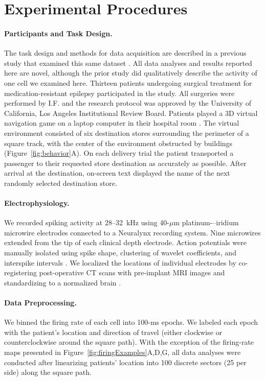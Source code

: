 \section{Experimental Procedures}

\paragraph{Participants and Task Design.} The task design and methods for data acquisition are described in a previous study that examined this same dataset \citep{JacoEtal10}. All data analyses and results reported here are novel, although the prior study \citep{JacoEtal10} did qualitatively describe the activity of one cell we examined here. Thirteen patients undergoing surgical treatment for medication-resistant epilepsy participated in the study.  All surgeries were performed by I.F. and the research protocol was approved by the University of California, Los Angeles Institutional Review Board.  Patients played a 3D virtual navigation game on a laptop computer in their hospital room \citep{EkstEtal03,JacoEtal10,JacoKaha10,JacoEtal13}. The virtual environment consisted of six destination stores surrounding the perimeter of a square track, with the center of the environment obstructed by buildings (Figure~\ref{fig:behavior}A). On each delivery trial the patient transported a passenger to their requested store destination as accurately as possible.  After arrival at the destination, on-screen text displayed the name of the next randomly selected destination store.

\paragraph{Electrophysiology.}  We recorded spiking activity at 28--32~kHz using 40-$\mu$m platinum-–iridium microwire electrodes \citep{FrieEtal99} connected to a Neuralynx recording system. Nine microwires extended from the tip of each clinical depth electrode. Action potentials were manually isolated using spike shape, clustering of wavelet coefficients, and interspike intervals \citep{QuirEtal04}.  We localized the locations of individual electrodes by co-registering post-operative CT scans with pre-implant MRI images and standardizing to a normalized brain \cite{TalaTour88}.

\paragraph{Data Preprocessing.} We binned the firing rate of each cell into 100-ms epochs. We labeled each epoch with the patient's location and direction of travel (either clockwise or counterclockwise around the square path). With the exception of the firing-rate maps presented in Figure~\ref{fig:firingExamples}A,D,G, all data analyses were conducted after linearizing patients' location into 100 discrete sectors (25 per side) along the square path.

